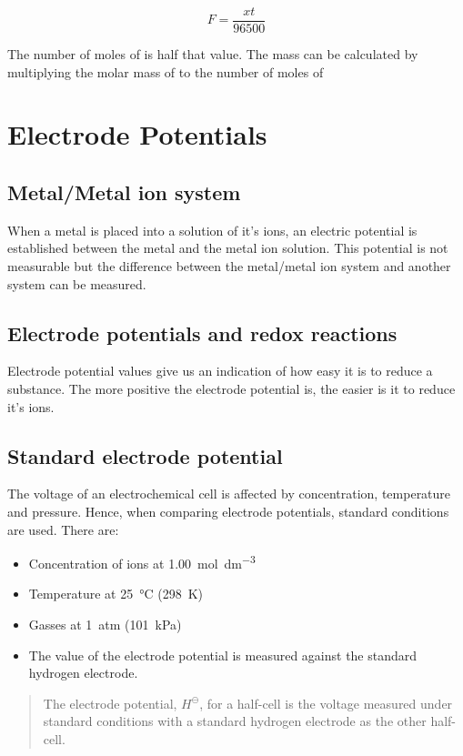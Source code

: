 \documentclass{scrbook}
\begin{document}
	\[ F = \frac{xt}{96500} \]

	The number of moles of  is half that value. The mass can be calculated by multiplying the molar mass of  to the number of moles of 

\section{Electrode Potentials}

\subsection{Metal/Metal ion system}

	When a metal is placed into a solution of it's ions, an electric potential is established between the metal and the metal ion solution. This potential is not measurable but the difference between the metal/metal ion system and another system can be measured.

\subsection{Electrode potentials and redox reactions}

	Electrode potential values give us an indication of how easy it is to reduce a substance. The more positive the electrode potential is, the easier is it to reduce it's ions.

\subsection{Standard electrode potential}

	The voltage of an electrochemical cell is affected by concentration, temperature and pressure. Hence, when comparing electrode potentials, standard conditions are used. There are:

	\begin{itemize}
		\item
			Concentration of ions at \SI{1.00}{\mole\per\deci\metre\cubed}
		\item
			Temperature at \SI{25}{\celsius} (\SI{298}{\kelvin})
		\item
			Gasses at \SI{1}{atm} (\SI{101}{\kilo\pascal})
		\item
			The value of the electrode potential is measured against the standard hydrogen electrode.
	\end{itemize}

	\begin{quote}
		The electrode potential, $H^\ominus$, for a half-cell is the voltage measured under standard conditions with a standard hydrogen electrode as the other half-cell.
	\end{quote}
\end{document}
